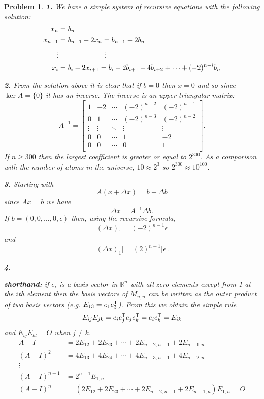 \documentclass{article}
\newcommand{\subno}[1]{\par\noindent\textbf{#1}}
\theoremstyle{pprop}
\newtheorem{problem}{Problem}[section]
\begin{document}
\begin{problem}
\noindent\textbf{1.} We have a simple system of recursive equations with the following solution:
 \begin{align*}
 x_n &= b_n \\
 x_{n-1} & = b_{n-1}-2x_n=b_{n-1}-2b_n \\
 \vdots & \kern15ex \vdots \\
 x_i & = b_{i}-2x_{i+1}=b_{i}-2b_{i+1}+4b_{i+2}+\cdots+(-2)^{n-i}b_n
 \end{align*}   
\par\noindent\textbf{2.} From the solution above it is clear that if $b=0$ then $x=0$ and so since $\ker A=\{0\}$ it has an inverse. The inverse is an upper-triangular matrix:
$$
A^{-1}=\begin{bmatrix}
1 & -2 & \cdots & (-2)^{n-2} & (-2)^{n-1} \\
0 & 1 & \cdots & (-2)^{n-3} & (-2)^{n-2} \\
\vdots & \vdots & \ddots & \vdots & \vdots \\
0 & 0 & \cdots & 1 & -2 \\
0 & 0 & \cdots & 0 & 1 \\
\end{bmatrix}.
$$
If $n \geq 300$ then the largest coefficient is greater or equal to $2^{300}$. As a comparison with the number of atoms in the universe, 
$10 \approx 2^3$ so $2^{300}\approx 10^{100}$.
\subno{3.} Starting with 
$$
A(x+\Delta x)=b+\Delta b
$$
since $Ax=b$
we have 
$$
\Delta x =A^{-1} \Delta b.
$$
If $b=(0,0,\ldots,0,\epsilon)$ then, using the recursive formula, 
$$
(\Delta x)_1=(-2)^{n-1} \epsilon
$$
and
$$
\vert(\Delta x)_1\vert=(2)^{n-1} \vert\epsilon\vert.
$$
\subno{4.}
\subno{shorthand:} if $e_i$ is a basis vector in $\mathbb{R}^n$ with all zero elements except from 1 at the $i$th element then 
the basis vectors of $M_{n,n}$ can be written as the outer product of two basis vectors (e.g. $E_{13}=e_1 e_3^{\sf T}$). From this 
we obtain the simple rule 
$$
E_{ij}E_{jk}=e_i e_j^{\sf T} e_j e_k^{\sf T}=e_i e_k^{\sf T}=E_{ik}
$$
and $E_{ij}E_{kl}=O$ when $j \neq k$. 
\begin{align*}
A-I & = 2E_{12}+2E_{23}+ \cdots + 2 E_{n-2,n-1}+ 2 E_{n-1,n} \\
(A-I)^2 &=4 E_{13}+4E_{24}+ \cdots + 4E_{n-3,n-1}+ 4 E_{n-2,n} \\
\vdots \\
(A-I)^{n-1} & =2^{n-1} E_{1,n} \\
(A-I)^n & =(2E_{12}+2E_{23}+ \cdots + 2 E_{n-2,n-1}+ 2 E_{n-1,n})E_{1,n}=O

\end{align*}
\end{problem}
\end{document}
